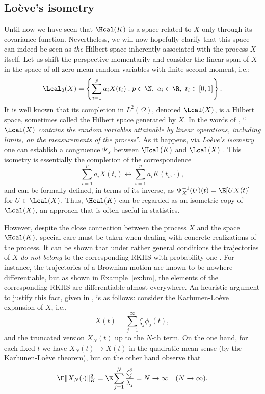 \subsection*{Loève's isometry}

Until now we have seen that \(\Hcal(K)\) is a space related to \(X\) only through its covariance function. Nevertheless, we will now hopefully clarify that this space can indeed be seen as \textit{the} Hilbert space inherently associated with the process \(X\) itself. Let us shift the perspective momentarily and consider the linear span of \(X\) in the space of all zero-mean random variables with finite second moment, i.e.:
\[
\Lcal_0(X) = \left\{\sum_{i=1}^p a_i X(t_i): p\in\N, \ a_i \in \R, \ t_i \in [0,1]\right\}.
\]
It is well known that its completion in \(L^2(\Omega)\), denoted \(\Lcal(X)\), is a Hilbert space, sometimes called the Hilbert space generated by \(X\). In the words of \citet{berlinet2004reproducing}, ``\(\Lcal(X)\) \textit{contains the random variables attainable by linear operations, including limits, on the measurements of the process}''. As it happens, via \textit{Loève's isometry} \citep{loeve1948fonctions} one can establish a congruence \(\Psi_X\) between \(\Hcal(K)\) and \(\Lcal(X)\) \citep[see Lemma 1.1 in][]{lukic2001stochastic}. This isometry is essentially the completion of the correspondence
  \begin{equation}\label{eq:loeves-isometry}
  \sum_{i=1}^p a_i X(t_i) \longleftrightarrow \sum_{i=1}^p a_i K(t_i, \cdot),
  \end{equation}
and can be formally defined, in terms of its inverse, as \(\Psi^{-1}_X(U)(t) = \E[U X(t)]\) for \(U \in \Lcal(X)\). Thus, \(\Hcal(K)\) can be regarded as an isometric copy of \(\Lcal(X)\), an approach that is often useful in statistics.

However, despite the close connection between the process \(X\) and the space \(\Hcal(K)\), special care must be taken when dealing with concrete realizations of the process. It can be shown that under rather general conditions the trajectories of \(X\) \textit{do not belong} to the corresponding RKHS with probability one \citep[see for example][Cor.~7.1]{lukic2001stochastic}. For instance, the trajectories of a Brownian motion are known to be nowhere differentiable, but as shown in Example~\ref{ex:bm}, the elements of the corresponding RKHS are differentiable almost everywhere. An heuristic argument to justify this fact, given in \citet{wahba1990spline}, is as follows: consider the Karhunen-Loève expansion of \(X\), i.e.,
\[
  X(t) = \sum_{j=1}^\infty \zeta_j \phi_j(t),
\]
and the truncated version \(X_N(t)\) up to the \(N\)-th term. On the one hand, for each fixed \(t\) we have \(X_N(t)\to X(t)\) in the quadratic mean sense (by the Karhunen-Loève theorem), but on the other hand observe that
\[
  \E\|X_N(\cdot)\|^2_K = \E \sum_{j=1}^N \frac{\zeta_j^2}{\lambda_j} = N \to \infty \quad (N\to\infty).
\]

